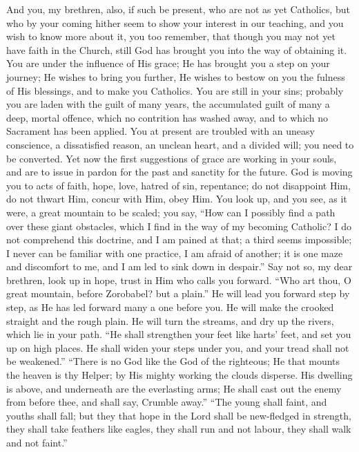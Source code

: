 And you, my brethren, also, if such be present, who are not as yet
Catholics, but who by your coming hither seem to show your interest in
our teaching, and you wish to know more about it, you too remember,
that though you may not yet have faith in the Church, still God has
brought you into the way of obtaining it. You are under the influence
of His grace; He has brought you a step on your journey; He wishes to
bring you further, He wishes to bestow on you the fulness of His
blessings, and to make you Catholics. You are still in your sins;
probably you are laden with the guilt of many years, the accumulated
guilt of many a deep, mortal offence, which no contrition has washed
away, and to which no Sacrament has been applied. You at present are
troubled with an uneasy conscience, a dissatisfied reason, an unclean
heart, and a divided will; you need to be converted. Yet now the first
suggestions of grace are working in your souls, and are to issue in
pardon for the past and sanctity for the future. God is moving you to
acts of faith, hope, love, hatred of sin, repentance; do not
disappoint Him, do not thwart Him, concur with Him, obey Him. You look
up, and you see, as it were, a great mountain to be scaled; you say,
``How can I possibly find a path over these giant obstacles, which
I find in the way of my becoming Catholic? I do not comprehend this
doctrine, and I am pained at that; a third seems impossible; I never
can be familiar with one practice, I am afraid of another; it is one
maze and discomfort to me, and I am led to sink down in despair.''
Say not so, my dear brethren, look up in hope, trust in Him who calls
you forward. ``Who art thou, O great mountain, before Zorobabel?
but a plain.'' He will lead you forward step by step, as He has
led forward many a one before you. He will make the crooked straight
and the rough plain. He will turn the streams, and dry up the rivers,
which lie in your path. ``He shall strengthen your feet like
harts' feet, and set you up on high places. He shall widen your steps
under you, and your tread shall not be weakened.'' ``There is
no God like the God of the righteous; He that mounts the heaven is thy
Helper; by His mighty working the clouds disperse. His dwelling is
above, and underneath are the everlasting arms; He shall cast out the
enemy from before thee, and shall say, Crumble away.'' ``The
young shall faint, and youths shall fall; but they that hope in the
Lord shall be new-fledged in strength, they shall take feathers like
eagles, they shall run and not labour, they shall walk and not
faint.''

